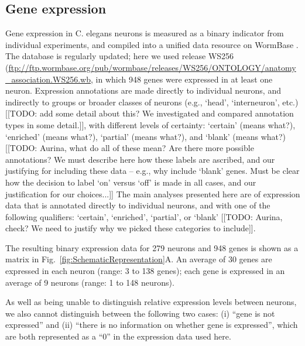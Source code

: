 \documentclass[10pt,letterpaper]{article}
\begin{document}
\subsection*{Gene expression}
Gene expression in C. elegans neurons is measured as a binary indicator from individual experiments, and compiled into a unified data resource on WormBase \cite{Harris:2009kd}.
The database is regularly updated; here we used release WS256 (\url{ftp://ftp.wormbase.org/pub/wormbase/releases/WS256/ONTOLOGY/anatomy_association.WS256.wb}, in which 948 genes were expressed in at least one neuron.
Expression annotations are made directly to individual neurons, and indirectly to groups or broader classes of neurons (e.g., `head', `interneuron', etc.) [[TODO: add some detail about this? We investigated and compared annotation types in some detail.]], with different levels of certainty: `certain' (means what?), `enriched' (means what?), `partial' (means what?), and `blank' (means what?) [[TODO: Aurina, what do all of these mean? Are there more possible annotations? We must describe here how these labels are ascribed, and our justifying for including these data -- e.g., why include `blank' genes. Must be clear how the decision to label `on' versus `off' is made in all cases, and our justification for our choices...]]
The main analyses presented here are of expression data that is annotated directly to individual neurons, and with one of the following qualifiers: `certain', `enriched', `partial', or `blank' [[TODO: Aurina, check? We need to justify why we picked these categories to include]].

The resulting binary expression data for 279 neurons and 948 genes is shown as a matrix in Fig.~\ref{fig:SchematicRepresentation}A.
An average of 30 genes are expressed in each neuron (range: 3 to 138 genes); each gene is expressed in an average of 9 neurons (range: 1 to 148 neurons).

As well as being unable to distinguish relative expression levels between neurons, we also cannot distinguish between the following two cases: (i) ``gene is not expressed'' and (ii) ``there is no information on whether gene is expressed'', which are both represented as a ``0'' in the expression data used here.


\end{document}
